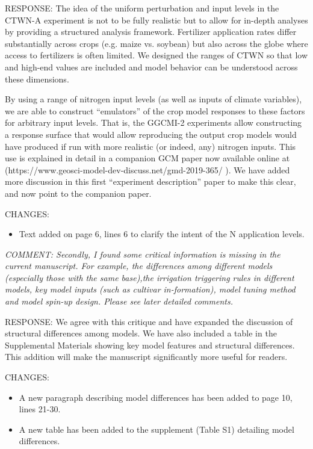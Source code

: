 \documentclass[gmd, manuscript]{copernicus} %
\begin{document}
RESPONSE: The idea of the uniform perturbation and input levels in the CTWN-A experiment is not to be fully realistic but to allow for in-depth analyses by providing a structured analysis framework. Fertilizer application rates differ substantially across crops (e.g. maize vs. soybean) but also across the globe where access to fertilizers is often limited. We designed the ranges of CTWN so that low and high-end values are included and model behavior can be understood across these dimensions.

By using a range of nitrogen input levels (as well as inputs of climate variables), we are able to construct “emulators” of the crop model responses to these factors for arbitrary input levels. That is, the GGCMI-2 experiments allow constructing a response surface that would allow reproducing the output crop models would have produced  if run with more realistic (or indeed, any) nitrogen inputs. This use is explained in detail in a companion GCM paper now available online at (https://www.geosci-model-dev-discuss.net/gmd-2019-365/ ). We have added more discussion in this first “experiment description” paper to make this clear, and now point to the companion paper.
\smallskip

CHANGES:
\begin{itemize}
    \item Text added on page 6, lines 6 to clarify the intent of the N application levels.
\end{itemize}

\smallskip

\textcolor{dark-gray}{\textit{COMMENT: Secondly, I found some critical information is missing in the current manuscript. For example, the differences among different models (especially those with the same base),the irrigation triggering rules in different models, key model inputs (such as cultivar in-formation), model tuning method and model spin-up design. Please see later detailed comments. }}

RESPONSE: We agree with this critique and have expanded the discussion of structural differences among models. We have also included a table in the Supplemental Materials showing key model features and structural differences. This addition will make the manuscript significantly more useful for readers.
\smallskip

CHANGES:
\begin{itemize}
    \item A new paragraph describing model differences has been added to page 10, lines 21-30.
    \item A new table has been added to the supplement (Table S1) detailing model differences.
\end{itemize}
\end{document}
